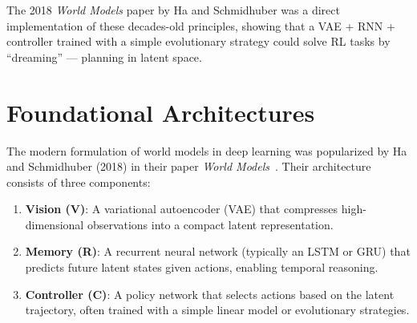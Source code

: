 \documentclass{tufte-handout}
\begin{document}
The 2018 \textit{World Models} paper by Ha and Schmidhuber was a direct implementation of these
decades-old principles, showing that a VAE + RNN + controller trained with a simple evolutionary
strategy could solve RL tasks by ``dreaming'' --- planning in latent space.

\section{Foundational Architectures}

The modern formulation of world models in deep learning was popularized by Ha and Schmidhuber
(2018) in their paper \textit{World Models}~\nocite{ha2018}. Their architecture consists of three components:


\begin{enumerate}
    \item \textbf{Vision (V)}: A variational autoencoder (VAE) that compresses high-dimensional
          observations into a compact latent representation.
    \item \textbf{Memory (R)}: A recurrent neural network (typically an LSTM or GRU) that
          predicts future latent states given actions, enabling temporal reasoning.
    \item \textbf{Controller (C)}: A policy network that selects actions based on the latent
          trajectory, often trained with a simple linear model or evolutionary strategies.
\end{enumerate}

\begin{marginfigure}[-3.0cm]
\centering
{}
\caption{Ha and Schmidhuber's three-component architecture.}
\label{fig:wm-arch}
\end{marginfigure}
\end{document}
